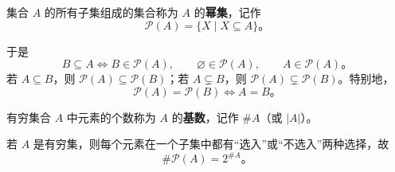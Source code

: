 \begin{definition}[幂集]
	集合 $A$ 的所有子集组成的集合称为 $A$ 的\textbf{幂集}，记作
	$$
	\mathcal{P}(A) = \{X \mid X \subseteq A\}。
	$$
\end{definition}

于是
$$
B \subseteq A \iff B \in \mathcal{P}(A), \qquad
\varnothing \in \mathcal{P}(A), \qquad
A \in \mathcal{P}(A)。
$$
若 $A \subseteq B$，则 $\mathcal{P}(A) \subseteq \mathcal{P}(B)$；若 $A \subsetneq B$，则 $\mathcal{P}(A) \subsetneq \mathcal{P}(B)$。特别地，
$$
\mathcal{P}(A) = \mathcal{P}(B) \iff A = B。
$$

\begin{definition}[有穷集的基数]
	有穷集合 $A$ 中元素的个数称为 $A$ 的\textbf{基数}，记作 $\# A$（或 $|A|$）。
\end{definition}

若 $A$ 是有穷集，则每个元素在一个子集中都有“选入”或“不选入”两种选择，故
$$
\# \mathcal{P}(A) = 2^{\# A}。
$$
